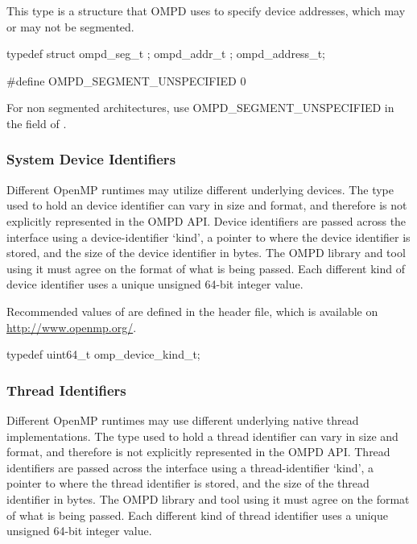 \label{ompd:ompd_address_t}

This type is a structure that OMPD uses to specify device addresses, 
which may or may not be segmented.

\format

\begin{ccppspecific}
\begin{ompEnv}
typedef struct {
  ompd_seg_t ;
  ompd_addr_t ;
} ompd_address_t;

#define OMPD_SEGMENT_UNSPECIFIED 0
\end{ompEnv}
\end{ccppspecific}


For non segmented architectures, use OMPD\_SEGMENT\_UNSPECIFIED in the  
field of .

\subsubsection{System Device Identifiers}

Different OpenMP runtimes may utilize different underlying devices.
The type used to hold an device identifier can vary in size and format, and 
therefore is not explicitly represented in the OMPD API. Device identifiers are 
passed across the interface using a device-identifier `kind', a pointer to where
the device identifier is stored, and the size of the device identifier in bytes.
The OMPD library and tool using it must agree on the format
of what is being passed.
Each different kind of device identifier uses a unique
unsigned 64-bit integer value.

Recommended values of  are defined in the  
header file, which is available on \url{http://www.openmp.org/}. 

\label{ompd:omp_device_kind_t}
\format

	\begin{ccppspecific}
	\begin{ompSyntax}
typedef uint64_t omp_device_kind_t;
	\end{ompSyntax}
	\end{ccppspecific}


\subsubsection{Thread Identifiers}

Different OpenMP runtimes may use different underlying native
thread implementations.
The type used to hold a thread identifier can vary in size and format, and 
therefore is not explicitly represented in the OMPD API. Thread identifiers are 
passed across the interface using a thread-identifier `kind', a pointer to where
the thread identifier is stored, and the size of the thread identifier in bytes.
The OMPD library and tool using it must agree on the format
of what is being passed.
Each different kind of thread identifier uses a unique
unsigned 64-bit integer value.

